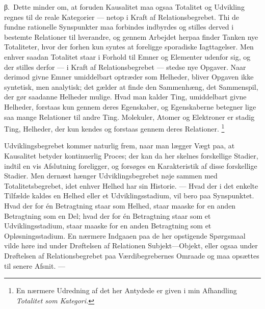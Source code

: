 \documentclass[12pt]{article}
\newcommand{\opage}[1]{\marginnote{\footnotesize\textit{[#1]}}}
\begin{document}
%
\label{sec:3c-beta}%
β.~Dette minder om, at foruden Kausalitet maa ogsaa Totalitet og
Udvikling regnes til de reale Kategorier --- netop i Kraft af
Relationsbegrebet. Thi de fundne rationelle Synspunkter maa forbindes
indbyrdes og stilles derved i bestemte Relationer til hverandre, og
gennem Arbejdet herpaa finder Tanken nye Totaliteter, hvor der forhen kun
syntes at foreligge sporadiske Iagttagelser. Men enhver
\opage{56} \setcounter{footnote}{0}
saadan Totalitet staar i Forhold til Emner og Elementer udenfor sig, og
der stilles derfor --- i Kraft af Relationsbegrebet --- stedse nye
Opgaver. Naar derimod givne Emner umiddelbart optræder som Helheder,
bliver Opgaven ikke syntetisk, men analytisk; det gælder at finde den
Sammenhæng, det Sammenspil, der gør saadanne Helheder mulige. Hvad man
kalder \guillemotright Ting\guillemotleft , umiddelbart givne Helheder,
forstaas kun gennem deres Egenskaber, og Egenskaberne betegner lige saa
mange Relationer til andre \guillemotright Ting\guillemotleft . Molekuler,
Atomer og Elektroner er stadig \guillemotright Ting\guillemotleft ,
Helheder, der kun kendes og forstaas gennem deres Relationer.%
\footnote{En nærmere Udredning af det her Antydede er given i min
Afhandling \textit{Totalitet som Kategori.}}

Udviklingsbegrebet kommer naturlig frem, naar man lægger Vægt paa, at
Kausalitet betyder kontinuerlig Proces; der kan da her skelnes
forskellige Stadier, indtil en vis Afslutning foreligger, og forsøges en
Karakteristik af disse forskellige Stadier. Men dernæst hænger
Udviklingsbegrebet nøje sammen med Totalitetsbegrebet, idet enhver Helhed
har sin Historie. --- Hvad der i det enkelte Tilfælde kaldes en Helhed
eller et Udviklingsstadium, vil bero paa Synspunktet. Hvad der for én
Betragtning staar som Helhed, staar maaske for en anden Betragtning som
en Del; hvad der for én Betragtning staar som et Udviklingsstadium, staar
maaske for en anden Betragtning som et Opløsningsstadium. En nærmere
Indgaaen paa de her opstigende Spørgsmaal vilde høre ind under Drøftelsen
af Relationen Subjekt---Objekt, eller ogsaa under Drøftelsen af
Relationsbegrebet paa Værdibegrebernes Omraade og maa opsættes til senere
Afsnit. ---
\end{document}
